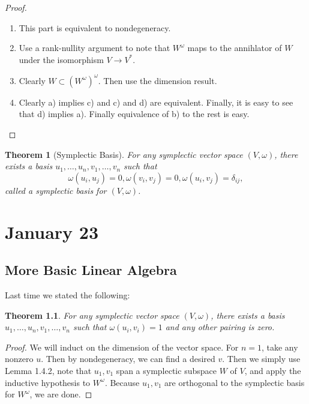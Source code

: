 \documentclass[leqno, openany]{memoir}
\newtheorem{thm}{Theorem}[chapter]
\theoremstyle{definition}
\theoremstyle{remark}
\theoremstyle{plain}
\newtheorem*{thm*}{Theorem}
\theoremstyle{definition}
\theoremstyle{remark}
\begin{document}
\begin{proof} \begin{enumerate} \item This part is equivalent to nondegeneracy.
    \item Use a rank-nullity argument to note that $W^{\omega}$ maps to the
        annihlator of $W$ under the isomorphism $V \to V^*$.  \item Clearly $W
        \subset { (W^{\omega}) }^{\omega}$. Then use the dimension result.
        \item Clearly a) implies c) and c) and d) are equivalent. Finally, it
    is easy to see that d) implies a). Finally equivalence of b) to the rest is
    easy.  \end{enumerate} \end{proof}

\begin{thm}[Symplectic Basis] For any symplectic vector space $(V, \omega)$,
    there exists a basis $u_1, \ldots, u_n, v_1, \ldots, v_n$ such that \[
    \omega(u_i,u_j) = 0, \omega(v_i, v_j) = 0, \omega(u_i, v_j) =
\delta_{ij},\] called a \textit{symplectic basis for $(V, \omega)$}.  \end{thm}

\chapter{January 23}%

\section{More Basic Linear Algebra}%

Last time we stated the following: \begin{thm*} For any symplectic vector space
$(V, \omega)$, there exists a basis $u_1, \ldots, u_n, v_1, \ldots, v_n$ such
that $\omega(u_i, v_i) = 1$ and any other pairing is zero.  \end{thm*}

\begin{proof} We will induct on the dimension of the vector space. For $n = 1$,
    take any nonzero $u$. Then by nondegeneracy, we can find a desired $v$.
    Then we simply use Lemma 1.4.2, note that $u_1, v_1$ span a symplectic
    subspace $W$ of $V$, and apply the inductive hypothesis to $W^{\omega}$.
    Because $u_1, v_1$ are orthogonal to the symplectic basis for $W^{\omega}$,
    we are done.  \end{proof}
\end{document}
